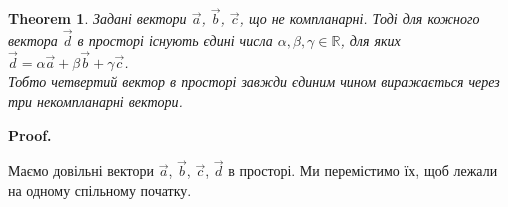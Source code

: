 \documentclass[a4paper, 10pt]{extarticle}
\makeatletter
\def\qed{$\blacksquare$}
\def\qed{$\blacksquare$}
\theoremstyle{theoremdd}
\newtheorem{theorem}{Theorem}[subsection]
\theoremstyle{theoremdd}
\theoremstyle{theoremdd}
\theoremstyle{theoremdd}
\theoremstyle{theoremdd}
\theoremstyle{theoremdd}
\theoremstyle{theoremdd}
\theoremstyle{theoremdd}
\renewenvironment{proof}[1][Proof.\\]{\par
\pushQED{\hfill \qed}%
\normalfont \topsep6\p@\@plus6\p@\relax
\trivlist
\item\relax
{\bfseries
#1\@addpunct{.}}\hspace\labelsep\ignorespaces
}{%
\popQED\endtrivlist\@endpefalse
}
\makeatother
\begin{document}
\begin{theorem}
Задані вектори $\vec{a}$, $\vec{b}$, $\vec{c}$, що не компланарні. Тоді для кожного вектора $\vec{d}$ в просторі існують єдині числа $\alpha, \beta, \gamma \in \mathbb{R}$, для яких $\vec{d} = \alpha \vec{a} + \beta \vec{b} + \gamma \vec{c}$.\\
Тобто четвертий вектор в просторі завжди єдиним чином виражається через три некомпланарні вектори.
\end{theorem}

\begin{proof}
	Маємо довільні вектори $\vec{a}$, $\vec{b}$, $\vec{c}$, $\vec{d}$ в просторі. Ми перемістимо їх, щоб лежали на одному спільному початку.
\begin{figure}[H]
\centering
\end{figure}
\end{proof}
\end{document}
